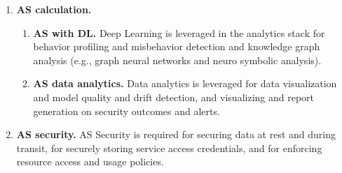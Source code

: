 \begin{enumerate}
\begin{enumerate}
  \end{enumerate}


\item{\bf AS calculation.}

  \begin{enumerate}
  
  \item{\bf AS with DL.} Deep Learning is leveraged in the analytics stack for behavior profiling and misbehavior detection and knowledge graph analysis (e.g., graph neural networks and neuro symbolic analysis).
  
  \item{\bf AS data analytics.} Data analytics is leveraged for data visualization and model quality and drift detection, and visualizing and report generation on security outcomes and alerts. 
  
  \end{enumerate}

\item{\bf AS security.} AS Security is required for securing data at rest and during transit, for securely storing service access credentials, and for enforcing resource access and usage policies. 

\end{enumerate}


